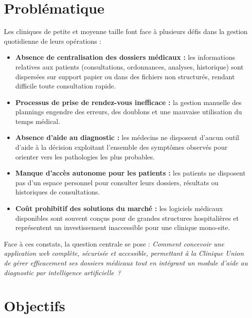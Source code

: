 \documentclass[12pt,a4paper]{report}
\begin{document}
\section{Problématique}

Les cliniques de petite et moyenne taille font face à plusieurs défis dans la gestion
quotidienne de leurs opérations :

\begin{itemize}
    \item \textbf{Absence de centralisation des dossiers médicaux :} les informations
    relatives aux patients (consultations, ordonnances, analyses, historique) sont
    dispersées sur support papier ou dans des fichiers non structurés, rendant
    difficile toute consultation rapide.

    \item \textbf{Processus de prise de rendez-vous inefficace :} la gestion manuelle
    des plannings engendre des erreurs, des doublons et une mauvaise utilisation du
    temps médical.

    \item \textbf{Absence d'aide au diagnostic :} les médecins ne disposent d'aucun
    outil d'aide à la décision exploitant l'ensemble des symptômes observés pour
    orienter vers les pathologies les plus probables.

    \item \textbf{Manque d'accès autonome pour les patients :} les patients ne
    disposent pas d'un espace personnel pour consulter leurs dossiers, résultats ou
    historiques de consultations.

    \item \textbf{Coût prohibitif des solutions du marché :} les logiciels médicaux
    disponibles sont souvent conçus pour de grandes structures hospitalières et
    représentent un investissement inaccessible pour une clinique mono-site.
\end{itemize}

Face à ces constats, la question centrale se pose : \textit{Comment concevoir une
application web complète, sécurisée et accessible, permettant à la Clinique Union de gérer
efficacement ses dossiers médicaux tout en intégrant un module d'aide au diagnostic par
intelligence artificielle~?}

\section{Objectifs}
\end{document}
